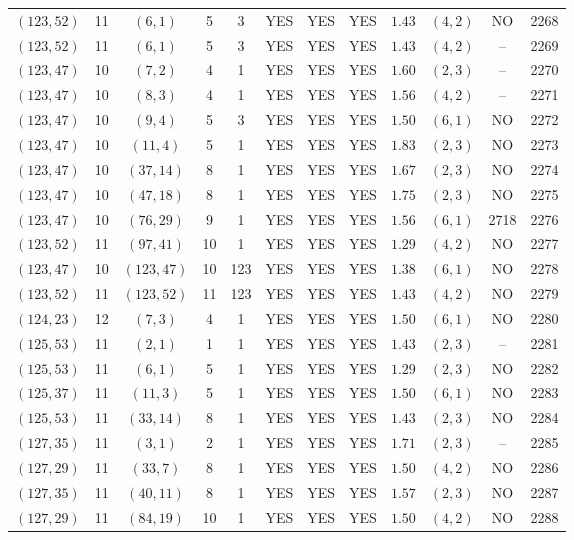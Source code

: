 \begin{longtable}{|c|c|c|c|c|c|c|c|c|c|c|c|}
$(123,52)$ & 11 & $(6,1)$ & 5 & 3 & YES & YES & YES & $1.43$ & $(4,2)$ & NO & 2268\\
$(123,52)$ & 11 & $(6,1)$ & 5 & 3 & YES & YES & YES & $1.43$ & $(4,2)$ & -- & 2269\\
$(123,47)$ & 10 & $(7,2)$ & 4 & 1 & YES & YES & YES & $1.60$ & $(2,3)$ & -- & 2270\\
$(123,47)$ & 10 & $(8,3)$ & 4 & 1 & YES & YES & YES & $1.56$ & $(4,2)$ & -- & 2271\\
$(123,47)$ & 10 & $(9,4)$ & 5 & 3 & YES & YES & YES & $1.50$ & $(6,1)$ & NO & 2272\\
$(123,47)$ & 10 & $(11,4)$ & 5 & 1 & YES & YES & YES & $1.83$ & $(2,3)$ & NO & 2273\\
$(123,47)$ & 10 & $(37,14)$ & 8 & 1 & YES & YES & YES & $1.67$ & $(2,3)$ & NO & 2274\\
$(123,47)$ & 10 & $(47,18)$ & 8 & 1 & YES & YES & YES & $1.75$ & $(2,3)$ & NO & 2275\\
$(123,47)$ & 10 & $(76,29)$ & 9 & 1 & YES & YES & YES & $1.56$ & $(6,1)$ & 2718 & 2276\\
$(123,52)$ & 11 & $(97,41)$ & 10 & 1 & YES & YES & YES & $1.29$ & $(4,2)$ & NO & 2277\\
$(123,47)$ & 10 & $(123,47)$ & 10 & 123 & YES & YES & YES & $1.38$ & $(6,1)$ & NO & 2278\\
$(123,52)$ & 11 & $(123,52)$ & 11 & 123 & YES & YES & YES & $1.43$ & $(4,2)$ & NO & 2279\\
$(124,23)$ & 12 & $(7,3)$ & 4 & 1 & YES & YES & YES & $1.50$ & $(6,1)$ & NO & 2280\\
$(125,53)$ & 11 & $(2,1)$ & 1 & 1 & YES & YES & YES & $1.43$ & $(2,3)$ & -- & 2281\\
$(125,53)$ & 11 & $(6,1)$ & 5 & 1 & YES & YES & YES & $1.29$ & $(2,3)$ & NO & 2282\\
$(125,37)$ & 11 & $(11,3)$ & 5 & 1 & YES & YES & YES & $1.50$ & $(6,1)$ & NO & 2283\\
$(125,53)$ & 11 & $(33,14)$ & 8 & 1 & YES & YES & YES & $1.43$ & $(2,3)$ & NO & 2284\\
$(127,35)$ & 11 & $(3,1)$ & 2 & 1 & YES & YES & YES & $1.71$ & $(2,3)$ & -- & 2285\\
$(127,29)$ & 11 & $(33,7)$ & 8 & 1 & YES & YES & YES & $1.50$ & $(4,2)$ & NO & 2286\\
$(127,35)$ & 11 & $(40,11)$ & 8 & 1 & YES & YES & YES & $1.57$ & $(2,3)$ & NO & 2287\\
$(127,29)$ & 11 & $(84,19)$ & 10 & 1 & YES & YES & YES & $1.50$ & $(4,2)$ & NO & 2288\\

\end{longtable}
